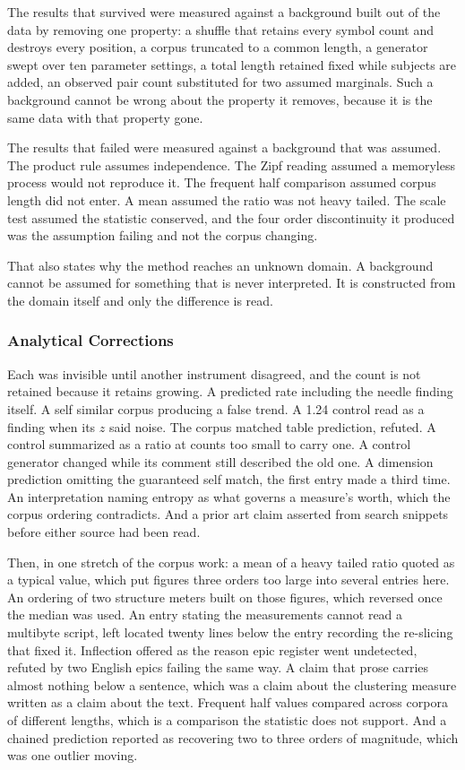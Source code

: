 The results that survived were measured against a background built out of the data by removing one property: a shuffle that retains every symbol count and destroys every position, a corpus truncated to a common length, a generator swept over ten parameter settings, a total length retained fixed while subjects are added, an observed pair count substituted for two assumed marginals. Such a background cannot be wrong about the property it removes, because it is the same data with that property gone.

The results that failed were measured against a background that was assumed. The product rule assumes independence. The Zipf reading assumed a memoryless process would not reproduce it. The frequent half comparison assumed corpus length did not enter. A mean assumed the ratio was not heavy tailed. The scale test assumed the statistic conserved, and the four order discontinuity it produced was the assumption failing and not the corpus changing.

That also states why the method reaches an unknown domain. A background cannot be assumed for something that is never interpreted. It is constructed from the domain itself and only the difference is read.

\subsubsection{Analytical Corrections}

Each was invisible until another instrument disagreed, and the count is not retained because it retains growing. A predicted rate including the needle finding itself. A self similar corpus producing a false trend. A 1.24 control read as a finding when its \(z\) said noise. The corpus matched table prediction, refuted. A control summarized as a ratio at counts too small to carry one. A control generator changed while its comment still described the old one. A dimension prediction omitting the guaranteed self match, the first entry made a third time. An interpretation naming entropy as what governs a measure's worth, which the corpus ordering contradicts. And a prior art claim asserted from search snippets before either source had been read.

Then, in one stretch of the corpus work: a mean of a heavy tailed ratio quoted as a typical value, which put figures three orders too large into several entries here. An ordering of two structure meters built on those figures, which reversed once the median was used. An entry stating the measurements cannot read a multibyte script, left located twenty lines below the entry recording the re-slicing that fixed it. Inflection offered as the reason epic register went undetected, refuted by two English epics failing the same way. A claim that prose carries almost nothing below a sentence, which was a claim about the clustering measure written as a claim about the text. Frequent half values compared across corpora of different lengths, which is a comparison the statistic does not support. And a chained prediction reported as recovering two to three orders of magnitude, which was one outlier moving.

